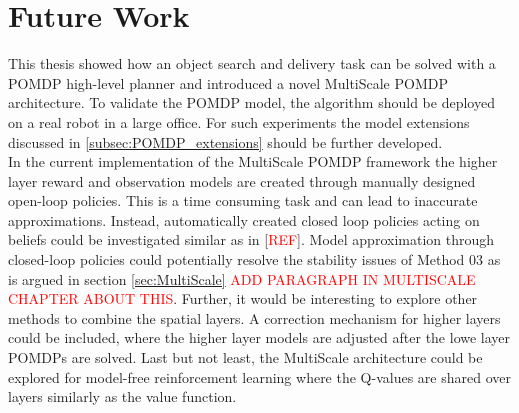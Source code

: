\section{Future Work}
This thesis showed how an object search and delivery task can be solved with a POMDP high-level planner and introduced a novel MultiScale POMDP architecture. To validate the POMDP model, the algorithm should be deployed on a real robot in a large office. For such experiments the model extensions discussed in \ref{subsec:POMDP_extensions} should be further developed.\\

In the current implementation of the MultiScale POMDP framework the higher layer reward and observation models are created through manually designed open-loop policies. This is a time consuming task and can lead to inaccurate approximations. Instead, automatically created closed loop policies acting on beliefs could be investigated similar as in [\textcolor{red}{REF}]. Model approximation through closed-loop policies could potentially resolve the stability issues of Method 03 as is argued in section \ref{sec:MultiScale} \textcolor{red}{ADD PARAGRAPH IN MULTISCALE CHAPTER ABOUT THIS}. Further, it would be interesting to explore other methods to combine the spatial layers. A correction mechanism for higher layers could be included, where the higher layer models are adjusted after the lowe layer POMDPs are solved. Last but not least, the MultiScale architecture could be explored for model-free reinforcement learning where the Q-values are shared over layers similarly as the value function. 
 